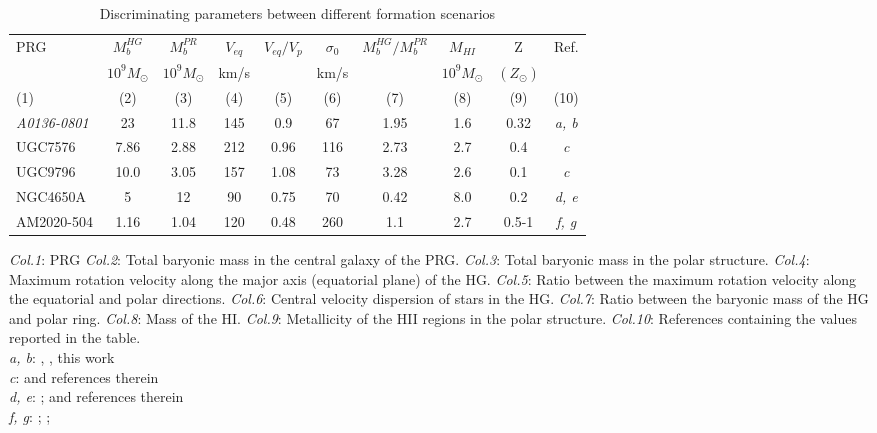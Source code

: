 \documentclass[useAMS,usenatbib]{mn2e}
\begin{document}
\begin{table}
\begin{minipage}{140mm}
\caption{Discriminating parameters between different formation scenarios}   %
\label{scenarios}      %
\begin{tabular}{l c c c c c c c c  c}        
\hline\hline                 %
PRG & $M_{b}^{HG}$ & $M_{b}^{PR}$ & $V_{eq}$ & $V_{eq}/V_{p}$ & $\sigma_{0}$ & $M_{b}^{HG}/M_{b}^{PR}$ & $M_{HI}$& Z&  Ref.\\    
        & $10^{9} M_{\odot}$ & $10^{9} M_{\odot}$ & km/s & & km/s & & $10^{9} M_{\odot}$ & $(Z_{\odot})$ & \\
(1)   & (2) & (3) & (4) & (5) & (6) & (7) & (8) & (9) & (10) \\
\hline                        %
   {\it A0136-0801} & 23 & 11.8   &  145 &  0.9   &  67 &  1.95& 1.6 & 0.32 & {\em a, b}\\
   \hline
   UGC7576 & 7.86  & 2.88 &  212 & 0.96  & 116 & 2.73 & 2.7 & 0.4 & {\em c}\\      %
   UGC9796  & 10.0 & 3.05 &  157 & 1.08  &  73 &  3.28 & 2.6 & 0.1 & {\em c}\\
   NGC4650A  & 5    & 12    &  90  &  0.75  &  70 &  0.42 & 8.0 & 0.2 & {\em d, e}\\
   AM2020-504 & 1.16   & 1.04     &  120 &  0.48  & 260 &  1.1 & 2.7 & 0.5-1 & {\em f, g}\\
\hline                                   %
\end{tabular}
%
{\em Col.1}: PRG {\em Col.2}: Total baryonic mass in the central
galaxy of the PRG. {\em Col.3}: Total baryonic mass in the polar
structure.  {\em Col.4}: Maximum rotation velocity along the major
axis (equatorial plane) of the HG. {\em Col.5}: Ratio between the
maximum rotation velocity along the equatorial and polar
directions. {\em Col.6}: Central velocity dispersion of stars in the HG. {\em
  Col.7}: Ratio between the baryonic mass of the HG and polar
ring. {\em Col.8}: Mass of the HI. {\em Col.9}: Metallicity of the HII
regions in the polar structure. {\em Col.10}: References containing
the values reported in the table.\\ {\em a, b}: \citet{Sch83},
\citet{vanDriel00}, this work\\ {\em c}: \citet{Spav11} and references
therein\\ {\em d, e}: \citet{Iod02}; \citet{Iod06} and references
therein\\ {\em f, g}: \citet{Arn1993}; \citet{Van02}; \citet{Frei12}\\
\end{minipage}
\end{table}
\end{document}
